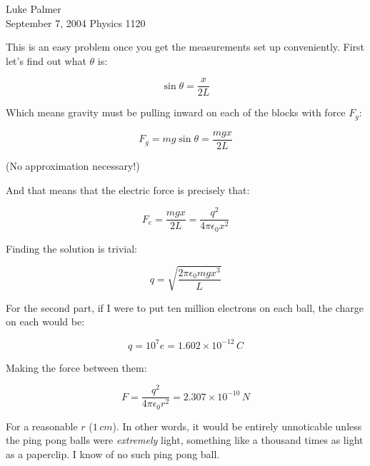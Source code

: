 \documentclass[12pt]{article}
\begin{document}
\noindent Luke Palmer  \\
          September 7, 2004 Physics 1120


This is an easy problem once you get the measurements set up
conveniently.  First let's find out what $\theta$ is:

\[  \sin{\theta} = \frac{x}{2L} \]

Which means gravity must be pulling inward on each of the blocks with
force $F_g$:

\[  F_g = mg \sin{\theta} = \frac{mgx}{2L} \]

(No approximation necessary!)

And that means that the electric force is precisely that:

\[  F_e = \frac{mgx}{2L} = \frac{q^2}{4\pi\epsilon{}_0x^2} \]

Finding the solution is trivial:

\[  q = \sqrt{\frac{2\pi\epsilon{}_0 mgx^3}{L}} \]

For the second part, if I were to put ten million electrons on each
ball, the charge on each would be:

\[  q = 10^7e = 1.602 \times 10^{-12} \, C \]

Making the force between them:

\[  F = \frac{q^2}{4\pi\epsilon{}_0 r^2} = 2.307 \times 10^{-10} \, N \]

For a reasonable $r$ ($1 \, \mathit{cm}$).  In other words, it would be
entirely unnoticable unless the ping pong balls were \textit{extremely}
light, something like a thousand times as light as a paperclip.  I know
of no such ping pong ball.
\end{document}
